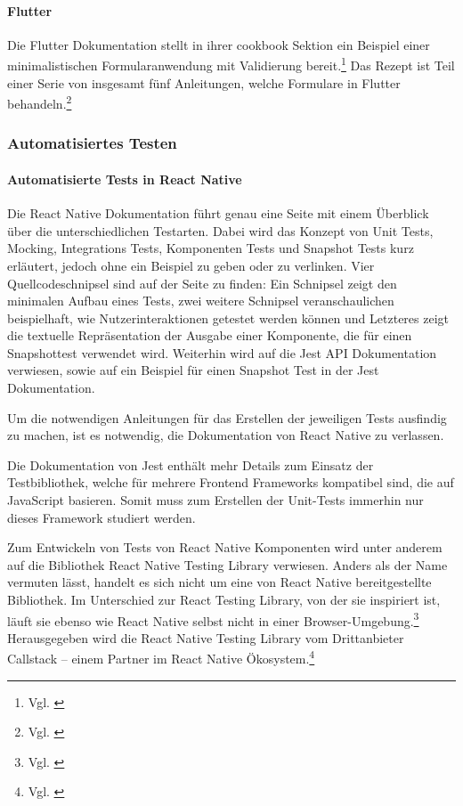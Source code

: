 \paragraph{Flutter}
Die Flutter Dokumentation stellt in ihrer cookbook Sektion ein Beispiel einer minimalistischen Formularanwendung mit Validierung bereit.\footnote{Vgl. \cite{BuildAFormWithValidation}} Das Rezept ist Teil einer Serie von insgesamt fünf Anleitungen, welche Formulare in Flutter behandeln.\footnote{Vgl. \cite{FormsFlutter}}

\subsubsection{Automatisiertes Testen}

\paragraph{Automatisierte Tests in React Native} Die React Native Dokumentation führt genau eine Seite mit einem Überblick über die unterschiedlichen Testarten.
Dabei wird das Konzept von Unit Tests, Mocking, Integrations Tests, Komponenten Tests und Snapshot Tests kurz erläutert, jedoch ohne ein Beispiel zu geben oder zu verlinken.
Vier Quellcodeschnipsel sind auf der Seite zu finden: Ein Schnipsel zeigt den minimalen Aufbau eines Tests, zwei weitere Schnipsel veranschaulichen beispielhaft, wie Nutzerinteraktionen getestet werden können und Letzteres zeigt die textuelle Repräsentation der Ausgabe einer Komponente, die für einen Snapshottest verwendet wird.
Weiterhin wird auf die Jest API Dokumentation verwiesen, sowie auf ein Beispiel für einen Snapshot Test in der Jest Dokumentation.

Um die notwendigen Anleitungen für das Erstellen der jeweiligen Tests ausfindig zu machen, ist es notwendig, die Dokumentation von React Native zu verlassen.

Die Dokumentation von Jest enthält mehr Details zum Einsatz der Testbibliothek, welche für mehrere Frontend Frameworks kompatibel sind, die auf JavaScript basieren. Somit muss zum Erstellen der Unit-Tests immerhin nur dieses Framework studiert werden.

Zum Entwickeln von Tests von React Native Komponenten wird unter anderem auf die Bibliothek React Native Testing Library verwiesen.
Anders als der Name vermuten lässt, handelt es sich nicht um eine von React Native bereitgestellte Bibliothek.
Im Unterschied zur React Testing Library, von der sie inspiriert ist, läuft sie  ebenso  wie React Native selbst nicht in einer Browser-Umgebung.\footnote{Vgl. \cite{NativeTestingLibraryIntroduction}} Herausgegeben wird die React Native Testing Library vom Drittanbieter Callstack -- einem Partner im React Native Ökosystem.\footnote{Vgl. \cite{TheReactNativeEcosystem}}

